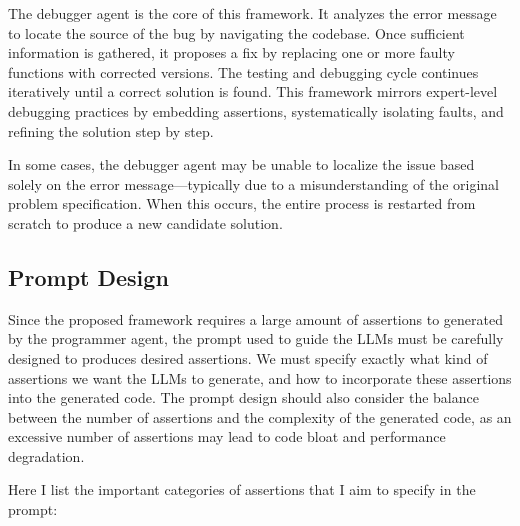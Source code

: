 The debugger agent is the core of this framework. It analyzes the error message to locate the source of the bug by navigating the codebase. Once sufficient information is gathered, it proposes a fix by replacing one or more faulty functions with corrected versions. The testing and debugging cycle continues iteratively until a correct solution is found. This framework mirrors expert-level debugging practices by embedding assertions, systematically isolating faults, and refining the solution step by step.

In some cases, the debugger agent may be unable to localize the issue based solely on the error message—typically due to a misunderstanding of the original problem specification. When this occurs, the entire process is restarted from scratch to produce a new candidate solution.


\subsection{Prompt Design}

Since the proposed framework requires a large amount of assertions to generated by the programmer agent, the prompt used to guide the LLMs must be carefully designed to produces desired assertions. We must specify exactly what kind of assertions we want the LLMs to generate, and how to incorporate these assertions into the generated code. The prompt design should also consider the balance between the number of assertions and the complexity of the generated code, as an excessive number of assertions may lead to code bloat and performance degradation.

Here I list the important categories of assertions that I aim to specify in the prompt:

